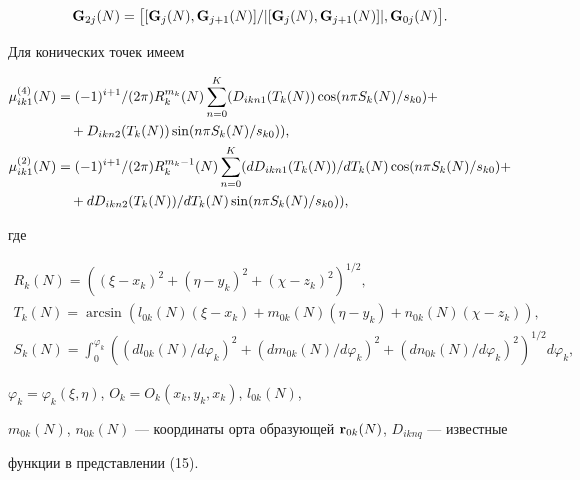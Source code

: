 \begin{pf}
\begin{gather*}
\bold G_{2j}(N)=\big[[\bold G_j(N),\bold G_{j+1}(N)]/ 


|[\bold G_j(N),\bold G_{j+1}(N)]|,\bold G_{0j}(N)\big]. 


\end{gather*} 


Для конических точек имеем 


\begin{align} 


\mu^{(4)}_{i k1}(N)&=(-1)^{i+1}/(2\pi)R^{m_k}_k(N) 


\sum^K_{n=0}(D_{i k n1}(T_k(N))\cos(n\pi S_k(N)/s_{k0})+\notag \\ 


&\quad +D_{i k n2}(T_k(N))\sin(n\pi S_k(N)/s_{k0})), \\ 


% 


\mu^{(2)}_{i k1}(N)&=(-1)^{i+1}/(2\pi)R^{m_k-1}_k(N) 


\sum^K_{n=0}(d D_{i k n1}(T_k(N))/d T_k(N) 


\cos(n\pi S_k(N)/s_{k0})+\notag\\ 


&\quad +d D_{i k n2}(T_k(N))/d T_k(N)\sin(n\pi S_k(N)/s_{k0})), 


\end{align} 


где 


\begin{gather*} 


R_k(N)=((\xi-x_k)^2+(\eta-y_k)^2+(\chi-z_k)^2)^{1/2},\\ 


T_k(N)=\arcsin(l_{0k}(N)(\xi-x_k)+m_{0k}(N)(\eta-y_k)+n_{0k}(N) 


(\chi-z_k)), \\ 


S_k(N)=\int^{\varphi_k}_0((d l_{0k}(N)/d\varphi_k)^2+ 


(d m_{0k}(N)/d\varphi_k)^2+(d n_{0k}(N)/d\varphi_k)^2)^{1/2}d\varphi_k, 


\end{gather*} 


$\varphi_k=\varphi_k(\xi,\eta)$, $O_k=O_k(x_k,y_k,x_k)$, $l_{0k}(N)$, 


$m_{0k}(N)$, $n_{0k}(N)$ --- координаты орта образующей $\bold 


r_{0k}(N)$, $D_{i k n q}$ --- известные 


функции в представлении (15). 



\end{pf}
